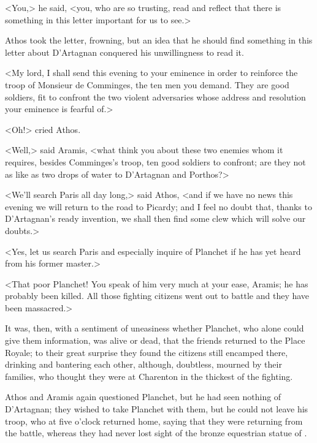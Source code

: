 <You,> he said, <you, who are so trusting, read and reflect that there is something in this letter important for us to see.>

Athos took the letter, frowning, but an idea that he should find something in this letter about D'Artagnan conquered his unwillingness to read it.

<My lord, I shall send this evening to your eminence in order to reinforce the troop of Monsieur de Comminges, the ten men you demand. They are good soldiers, fit to confront the two violent adversaries whose address and resolution your eminence is fearful of.>

<Oh!> cried Athos.

<Well,> said Aramis, <what think you about these two enemies whom it requires, besides Comminges's troop, ten good soldiers to confront; are they not as like as two drops of water to D'Artagnan and Porthos?>

<We'll search Paris all day long,> said Athos, <and if we have no news this evening we will return to the road to Picardy; and I feel no doubt that, thanks to D'Artagnan's ready invention, we shall then find some clew which will solve our doubts.>

<Yes, let us search Paris and especially inquire of Planchet if he has yet heard from his former master.>

<That poor Planchet! You speak of him very much at your ease, Aramis; he has probably been killed. All those fighting citizens went out to battle and they have been massacred.>

It was, then, with a sentiment of uneasiness whether Planchet, who alone could give them information, was alive or dead, that the friends returned to the Place Royale; to their great surprise they found the citizens still encamped there, drinking and bantering each other, although, doubtless, mourned by their families, who thought they were at Charenton in the thickest of the fighting.

Athos and Aramis again questioned Planchet, but he had seen nothing of D'Artagnan; they wished to take Planchet with them, but he could not leave his troop, who at five o'clock returned home, saying that they were returning from the battle, whereas they had never lost sight of the bronze equestrian statue of .